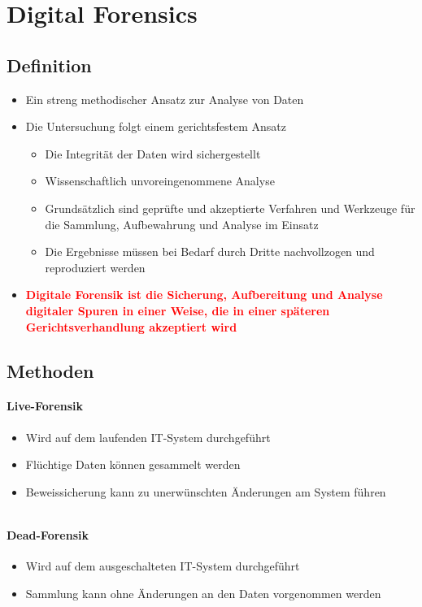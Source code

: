 \section{Digital Forensics}

\subsection{Definition}
\begin{itemize}
    \item Ein streng methodischer Ansatz zur Analyse von Daten
    \item Die Untersuchung folgt einem gerichtsfestem Ansatz
    \begin{itemize}
        \item Die Integrität der Daten wird sichergestellt
        \item Wissenschaftlich unvoreingenommene Analyse
        \item Grundsätzlich sind geprüfte und akzeptierte Verfahren und Werkzeuge für die Sammlung, Aufbewahrung und Analyse im Einsatz
        \item Die Ergebnisse müssen bei Bedarf durch Dritte nachvollzogen und reproduziert werden
    \end{itemize}
    \item \textbf{\textcolor{red}{Digitale Forensik ist die Sicherung, Aufbereitung und Analyse digitaler Spuren in einer Weise, die in einer späteren Gerichtsverhandlung akzeptiert wird}}
\end{itemize}

\subsection{Methoden}

\begin{minipage}{0.4\linewidth}
    \paragraph{Live-Forensik}
    \begin{itemize}
        \item Wird auf dem laufenden IT-System durchgeführt
        \item Flüchtige Daten können gesammelt werden
        \item Beweissicherung kann zu unerwünschten Änderungen am System führen
    \end{itemize}
    $ $
\end{minipage}
\begin{minipage}{0.5\linewidth}
    \paragraph{Dead-Forensik}
    \begin{itemize}
        \item Wird auf dem ausgeschalteten IT-System durchgeführt
        \item Sammlung kann ohne Änderungen an den Daten vorgenommen werden
    \end{itemize}
\end{minipage}

